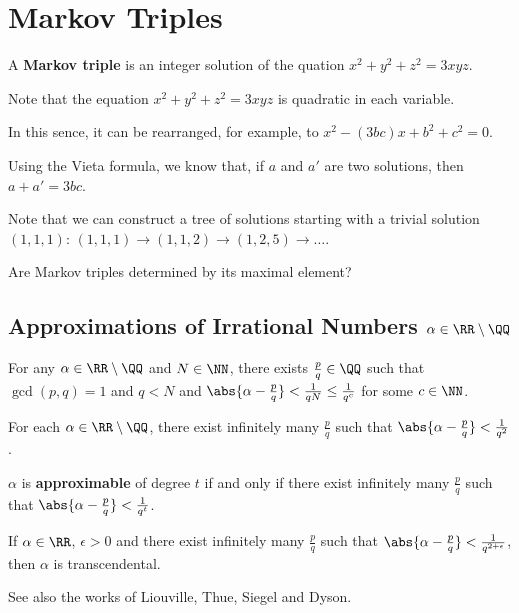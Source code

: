 \documentclass[11pt]{scrartcl}
\begin{document}
\section{Markov Triples}

\begin{definition}
A \textbf{Markov triple} is an integer solution of the quation $x^2+y^2+z^2 = 3xyz$.
\end{definition}

Note that the equation $x^2+y^2+z^2 = 3xyz$ is quadratic in each variable.

In this sence, it can be rearranged, for example, to $x^2-(3bc)x+b^2+c^2=0$.

Using the Vieta formula, we know that, if $a$ and $a'$ are two
solutions, then $a+a' = 3bc$.

Note that we can construct a tree of solutions starting with a trivial
solution $(1, 1, 1)$: $(1, 1, 1) \to (1, 1, 2)\to(1, 2, 5)\to \dots$.

\begin{ques*}

  Are Markov triples determined by its maximal element?

\end{ques*}

\subsection{Approximations of Irrational Numbers $\alpha \in \RR\setminus \QQ$}

\begin{theorem}
  For any $\alpha \in \RR \setminus \QQ$ and $N\in\NN$, there exists
  $\frac{p}{q}\in \QQ$ such that $\gcd(p, q)=1$ and $q < N$ and
  $\abs{\alpha - \frac{p}{q}} < \frac{1}{q\* N} \leq \frac{1}{q^c}$
  for some $ c\in\NN$.
\end{theorem}
\begin{corollary}
  For each $\alpha\in \RR\setminus\QQ$, there exist infinitely many
  $\frac{p}{q}$ such that
  $\abs{\alpha - \frac{p}{q}} < \frac{1}{q^2}$.
\end{corollary}
\begin{definition}
  $\alpha$ is \textbf{approximable} of degree $t$ if and only if there
  exist infinitely many $\frac{p}{q}$ such that
  $\abs{\alpha - \frac{p}{q}} < \frac{1}{q^t}$.
\end{definition}

\begin{theorem}
  If $\alpha \in \RR$, $\epsilon > 0$ and there exist infinitely many
  $\frac{p}{q}$ such that
  $\abs{\alpha - \frac{p}{q}} < \frac{1}{q^{2+\epsilon}}$, then
  $\alpha$ is transcendental.
\end{theorem}
\begin{remark}
See also the works of Liouville, Thue, Siegel and Dyson.
\end{remark}
\end{document}
